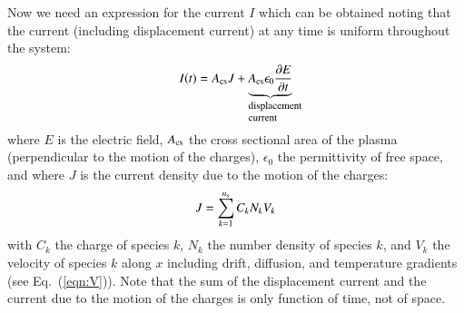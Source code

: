 \documentclass{warpdoc}
\newcommand{\ns}{{n_{\rm s}}}
\begin{document}
% 
Now we need an expression for the current $I$ which can be obtained noting that the current (including displacement current) at any time is uniform throughout the system:
%
\begin{equation}
  I(t)=A_{\rm cs} J + \underbrace{A_{\rm cs} \epsilon_0 \frac{\partial E}{\partial t}}_{\begin{minipage}{0.1\textwidth}\footnotesize displacement current \end{minipage}}
\end{equation}
%
where $E$ is the electric field, $A_{\rm cs}$ the cross sectional area of the plasma (perpendicular to the motion of the charges), $\epsilon_0$ the permittivity of free space, and where $J$ is the current density due to the motion of the charges:
%
\begin{equation}
  J=\sum_{k=1}^\ns C_k N_k V_k
\end{equation}
%
with $C_k$ the charge of species $k$, $N_k$ the number density of species $k$, and $V_k$ the velocity of species $k$ along $x$ including drift, diffusion, and temperature gradients (see Eq.\ (\ref{eqn:V})). Note that the sum of the displacement current and the current due to the motion of the charges  is only function of time, not of space. 
\end{document}
